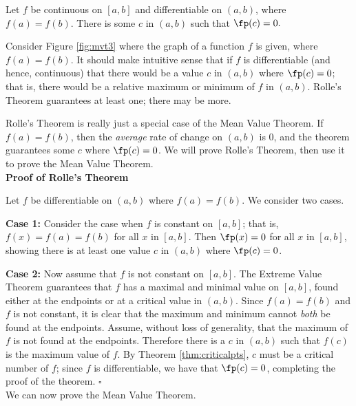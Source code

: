{Let $f$ be continuous on $[a,b]$ and differentiable on $(a,b)$, where $f(a) = f(b)$. There is some $c$ in $(a,b)$ such that $\fp(c) = 0.$}

Consider Figure \ref{fig:mvt3} where the graph of a function $f$ is given, where $f(a) = f(b)$. It should make intuitive sense that if $f$ is differentiable (and hence, continuous) that there would be a value $c$ in $(a,b)$ where $\fp(c)=0$; that is, there would be a relative maximum or minimum of $f$ in $(a,b)$. Rolle's Theorem guarantees at least one; there may be more. 


Rolle's Theorem is really just a special case of the Mean Value Theorem. If $f(a) = f(b)$, then the \textit{average} rate of change on $(a,b)$ is $0$, and the theorem guarantees some $c$ where $\fp(c)=0$. We will prove Rolle's Theorem, then use it to prove the Mean Value Theorem.\\

\noindent\textbf{Proof of Rolle's Theorem}

Let $f$ be differentiable on $(a,b)$ where $f(a)=f(b)$. We consider two cases. 

\noindent\textbf{Case 1:} Consider the case when $f$ is constant on $[a,b]$; that is, $f(x) = f(a) = f(b)$ for all $x$ in $[a,b]$. Then $\fp(x) = 0$ for all $x$ in $[a,b]$, showing there is at least one value $c$ in $(a,b)$ where $\fp(c)=0$.

\noindent\textbf{Case 2:} Now assume that $f$ is not constant on $[a,b]$. The Extreme Value Theorem guarantees that $f$ has a maximal and minimal value on $[a,b]$, found either at the endpoints or at a critical value in $(a,b)$. Since $f(a)=f(b)$ and $f$ is not constant, it is clear that the maximum and minimum cannot \textit{both} be found at the endpoints. Assume, without loss of generality, that the maximum of $f$ is not found at the endpoints. Therefore there is a $c$ in $(a,b)$ such that $f(c)$ is the maximum value of $f$. By Theorem \ref{thm:criticalpts}, $c$ must be a critical number of $f$; since $f$ is differentiable, we have that $\fp(c) = 0$, completing the proof of the theorem. \hfill $\square$\\

We can now prove the Mean Value Theorem.\\

